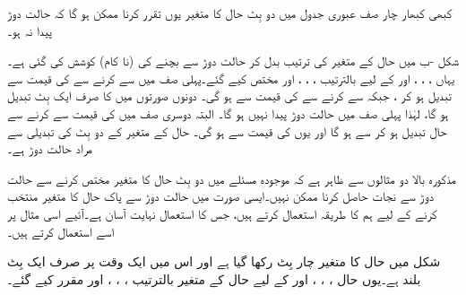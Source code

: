 کبھی کبھار چار صف عبوری جدول میں دو بِٹ حال کا متغیر یوں تقرر کرنا ممکن ہو گا کہ حالت دوڑ پیدا نہ ہو۔

شکل  -ب میں حال کے متغیر کی ترتیب بدل کر حالت دوڑ سے بچنے کی (نا کام) کوشش کی گئی ہے۔ یہاں ، ، ، اور  کے لیے بالترتیب ، ، ، اور  مختص کیے گئے۔پہلی صف میں سے  کرنے سے  کی قیمت  سے تبدیل ہو کر  ، جبکہ  سے  کرنے سے  کی قیمت  سے  ہو گی۔ دونوں صورتوں میں  کا صرف ایک بِٹ تبدیل ہو گا، لہٰذا پہلی صف میں حالت دوڑ پیدا نہیں ہو گا۔ البتہ دوسری صف میں  کی قیمت  سے  کرنے سے حال تبدیل ہو کر  سے  ہو گا اور یوں  کی قیمت  سے  ہو گی۔ حال کے متغیر کے دو بِٹ کی تبدیلی سے مراد حالت دوڑ ہے۔

مذکورہ بالا دو مثالوں سے ظاہر ہے کہ موجودہ مسئلے میں دو بِٹ حال کا متغیر مختص کرنے سے حالت دوڑ سے نجات حاصل کرنا ممکن نہیں۔ایسی صورت میں حالت دوڑ سے پاک حال کا متغیر منتخب کرنے کے لیے ہم  کا طریقہ استعمال کرتے ہیں، جس کا استعمال نہایت آسان ہے۔آئیے اسی مثال پر اسے استعمال کرتے ہیں۔

شکل  میں حال کا متغیر چار بِٹ رکھا گیا ہے اور اس میں ایک وقت پر صرف ایک بِٹ بلند ہے۔یوں حال  ، ، ، اور  کے لیے حال کے متغیر بالترتیب ، ، ، اور  مقرر کیے گئے۔


